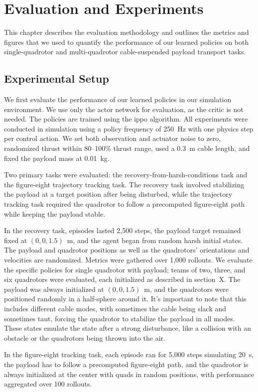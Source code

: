 \chapter{Evaluation and Experiments}
This chapter describes the evaluation methodology and outlines the metrics and figures that we used to quantify the performance of our learned policies on both single-quadrotor and multi-quadrotor cable-suspended payload transport tasks.

\section{Experimental Setup}
We first evaluate the performance of our learned policies in our simulation environment. We use only the actor network for evaluation, as the critic is not needed. The policies are trained using the \gls{ippo} algorithm.  
All experiments were conducted in simulation using a policy frequency of 250~Hz with one physics step per control action. We set both observation and actuator noise to zero, randomized thrust within 80--100\% thrust range, used a 0.3~m cable length, and fixed the payload mass at 0.01~kg.

Two primary tasks were evaluated: the recovery-from-harsh-conditions task and the figure-eight trajectory tracking task. The recovery task involved stabilizing the payload at a target position after being disturbed, while the trajectory tracking task required the quadrotor to follow a precomputed figure-eight path while keeping the payload stable.

In the recovery task, episodes lasted 2,500 steps, the payload target remained fixed at $(0,0,1.5)$~m, and the agent began from random harsh initial states. The payload and quadrotor positions as well as the quadrotors' orientations and velocities are randomized. Metrics were gathered over 1,000 rollouts. We evaluate the specific policies for single quadrotor with payload; teams of two, three, and six quadrotors were evaluated, each initialized as described in section~X. The payload was always initialized at $(0,0,1.5)$~m, and the quadrotors were positioned randomly in a half-sphere around it. It's important to note that this includes different cable modes, with sometimes the cable being slack and sometimes taut, forcing the quadrotor to stabilize the payload in all modes. These states emulate the state after a strong disturbance, like a collision with an obstacle or the quadrotors being thrown into the air.

In the figure-eight tracking task, each episode ran for 5,000 steps simulating 20~s, the payload has to follow a precomputed figure-eight path, and the quadrotor is always initialized at the center with quads in random positions, with performance aggregated over 100 rollouts.

